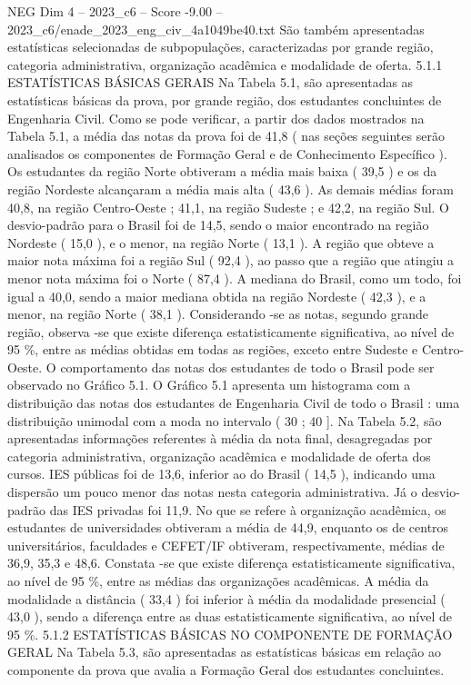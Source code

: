 \begin{textsample}{NEG Dim 4 – 2023\_c6 – Score -9.00 – 2023\_c6/enade\_2023\_eng\_civ\_4a1049be40.txt}
São também apresentadas estatísticas selecionadas de subpopulações, caracterizadas por grande região, categoria administrativa, organização acadêmica e modalidade de oferta. 5.1.1 ESTATÍSTICAS BÁSICAS GERAIS Na Tabela 5.1, são apresentadas as estatísticas básicas da prova, por grande região, dos estudantes concluintes de Engenharia Civil.
Como se pode verificar, a partir dos dados mostrados na Tabela 5.1, a média das notas da prova foi de 41,8 ( nas seções seguintes serão analisados os componentes de Formação Geral e de Conhecimento Específico ).
Os estudantes da região Norte obtiveram a média mais baixa ( 39,5 ) e os da região Nordeste alcançaram a média mais alta ( 43,6 ).
As demais médias foram 40,8, na região Centro-Oeste ; 41,1, na região Sudeste ; e 42,2, na região Sul.
O desvio-padrão para o Brasil foi de 14,5, sendo o maior encontrado na região Nordeste ( 15,0 ), e o menor, na região Norte ( 13,1 ).
A região que obteve a maior nota máxima foi a região Sul ( 92,4 ), ao passo que a região que atingiu a menor nota máxima foi o Norte ( 87,4 ).
A mediana do Brasil, como um todo, foi igual a 40,0, sendo a maior mediana obtida na região Nordeste ( 42,3 ), e a menor, na região Norte ( 38,1 ).
Considerando -se as notas, segundo grande região, observa -se que existe diferença estatisticamente significativa, ao nível de 95 \%, entre as médias obtidas em todas as regiões, exceto entre Sudeste e Centro-Oeste.
O comportamento das notas dos estudantes de todo o Brasil pode ser observado no Gráfico 5.1.
O Gráfico 5.1 apresenta um histograma com a distribuição das notas dos estudantes de Engenharia Civil de todo o Brasil : uma distribuição unimodal com a moda no intervalo ( 30 ; 40 ].
Na Tabela 5.2, são apresentadas informações referentes à média da nota final, desagregadas por categoria administrativa, organização acadêmica e modalidade de oferta dos cursos.
IES públicas foi de 13,6, inferior ao do Brasil ( 14,5 ), indicando uma dispersão um pouco menor das notas nesta categoria administrativa.
Já o desvio-padrão das IES privadas foi 11,9.
No que se refere à organização acadêmica, os estudantes de universidades obtiveram a média de 44,9, enquanto os de centros universitários, faculdades e CEFET/IF obtiveram, respectivamente, médias de 36,9, 35,3 e 48,6.
Constata -se que existe diferença estatisticamente significativa, ao nível de 95 \%, entre as médias das organizações acadêmicas.
A média da modalidade a distância ( 33,4 ) foi inferior à média da modalidade presencial ( 43,0 ), sendo a diferença entre as duas estatisticamente significativa, ao nível de 95 \%. 5.1.2 ESTATÍSTICAS BÁSICAS NO COMPONENTE DE FORMAÇÃO GERAL Na Tabela 5.3, são apresentadas as estatísticas básicas em relação ao componente da prova que avalia a Formação Geral dos estudantes concluintes.

\end{textsample}
